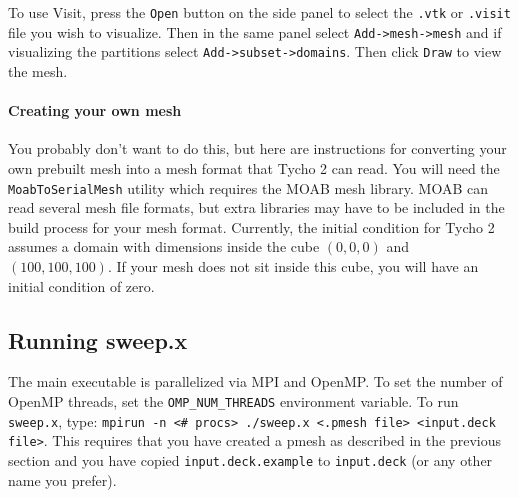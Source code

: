 \documentclass[12pt,letterpaper]{article}
\begin{document}
To use Visit, press the {\tt Open} button on the side panel to select the {\tt .vtk} or {\tt .visit} file you wish to visualize.
Then in the same panel select {\tt Add->mesh->mesh} and if visualizing the partitions select {\tt Add->subset->domains}.
Then click {\tt Draw} to view the mesh.


\paragraph{Creating your own mesh}
You probably don't want to do this, but here are instructions for converting your own prebuilt mesh into a mesh format that Tycho 2 can read.
You will need the {\tt MoabToSerialMesh} utility which requires the MOAB mesh library.
MOAB can read several mesh file formats, but extra libraries may have to be included in the build process for your mesh format.
Currently, the initial condition for Tycho 2 assumes a domain with dimensions inside the cube $(0,0,0)$ and $(100,100,100)$.
If your mesh does not sit inside this cube, you will have an initial condition of zero.





\subsection{Running sweep.x}
The main executable is parallelized via MPI and OpenMP.
To set the number of OpenMP threads, set the {\tt OMP\_NUM\_THREADS} environment variable.
To run {\tt sweep.x}, type: {\tt mpirun -n <\# procs> ./sweep.x <.pmesh file> <input.deck file>}.
This requires that you have created a pmesh as described in the previous section and you have copied {\tt input.deck.example} to {\tt input.deck} (or any other name you prefer).
\end{document}
